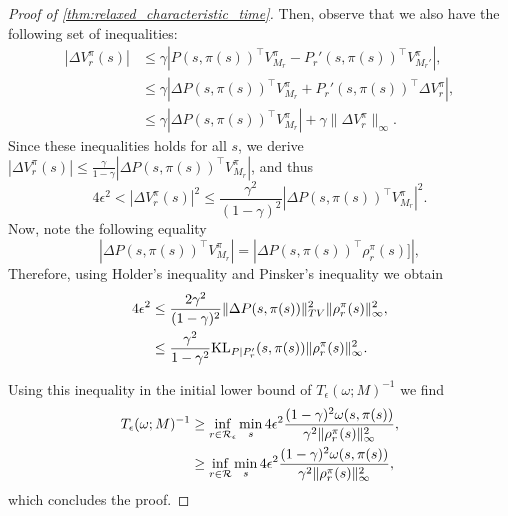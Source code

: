 \begin{proof}[Proof of \cref{thm:relaxed_characteristic_time}]
Then, observe that we also have the following set of inequalities:
 \begin{align*}
     |\Delta V_r^\pi(s)| &\leq \gamma  \left|P(s,\pi(s))^\top V_{M_r}^\pi- P_{r}'(s,\pi(s))^\top V_{M_r'}^\pi\right| ,\\
     &\leq \gamma  \left|\Delta P(s,\pi(s))^\top V_{M_r}^\pi+P_{r}'(s,\pi(s))^\top \Delta V_{r}^\pi\right| ,\\
     &\leq \gamma \left|\Delta P(s,\pi(s))^\top V_{M_r}^\pi\right| + \gamma \|\Delta V_r^\pi\|_\infty.
 \end{align*}
Since these inequalities holds for all $s$, we derive  $|\Delta V_r^\pi(s)| \leq \frac{\gamma}{1-\gamma}   \left|\Delta P(s,\pi(s))^\top V_{M_r}^\pi\right| $, and thus
\[
4\epsilon^2<|\Delta V_r^\pi(s)|^2 \leq \frac{\gamma^2}{(1-\gamma)^2}  \left|\Delta P(s,\pi(s))^\top V_{M_r}^\pi\right|^2 .
\]
Now, note the following equality
\[
\left|\Delta P(s,\pi(s))^\top V_{M_r}^\pi\right|=\left|\Delta P(s,\pi(s))^\top \rho_r^\pi(s)]\right|,
\]
Therefore, using Holder's inequality and Pinsker's inequality we obtain
\begin{align*}
4\epsilon^2 &\leq \frac{2\gamma^2}{(1-\gamma)^2}  \|\Delta P(s,\pi(s))\|_{TV}^2  \|\rho_r^\pi(s)\|_\infty^2,\\
&\leq \frac{\gamma^2}{1-\gamma^2} {\rm KL}_{P|P_r'}(s,\pi(s)) \|\rho_r^\pi(s)\|_\infty^2.
\end{align*}

Using this inequality in the initial lower bound of $T_\epsilon(\omega;M)^{-1}$ we find
\begin{align*}
T_\epsilon(\omega;M)^{-1} &\geq  \inf_{r\in {\cal R}_\epsilon} \min_s 4\epsilon^2 \frac{(1-\gamma)^2\omega(s,\pi(s))}{\gamma^2 \|\rho_r^\pi(s)\|_\infty^2},\\
&\geq  \inf_{r\in {\cal R}} \min_s 4\epsilon^2 \frac{(1-\gamma)^2\omega(s,\pi(s))}{\gamma^2 \|\rho_r^\pi(s)\|_\infty^2},
\end{align*}
which concludes the proof.
\end{proof}



